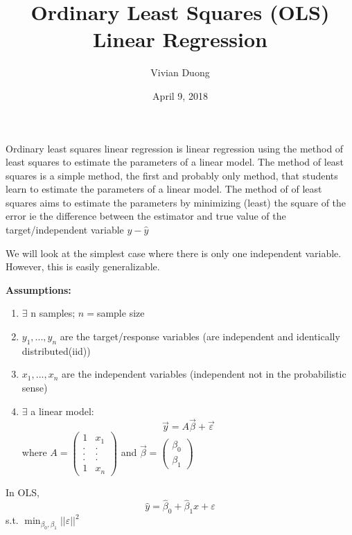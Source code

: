 \documentclass{article}
\title{Ordinary Least Squares (OLS) Linear Regression}
\author{Vivian Duong}
\date{April 9, 2018}
\begin{document}
\maketitle
Ordinary least squares linear regression is linear regression using the method of least squares to estimate the parameters of a linear model. The method of least squares is a simple method, the first and probably only method, that students learn to estimate the parameters of a linear model. \newline
The method of of least squares aims to estimate the parameters by minimizing (least) the square of the error ie the difference between the estimator and true value of the target/independent variable $ y - \hat{y}$

We will look at the simplest case where there is only one independent variable. However, this is easily generalizable.

\textbf{Assumptions:} \newline
\begin{enumerate}
	\item $\exists$ n samples; $n = $sample size
	\item $y_{1}, ..., y_{n}$ are the target/response variables (are independent and identically distributed(iid))
	\item $x_{1}, ..., x_{n}$ are the independent variables (independent not in the probabilistic sense) 
	\item $\exists$ a linear model:  
	\begin{equation} 
	\vec{y} = A\vec{\beta} + \vec{\varepsilon}
	\end{equation}
	\newline
	where $A = \left(\begin{array}{cc} 1 & x_1 \\ . & . \\ . & . \\ . & . \\ 1 & x_n \end{array} \right) $ and $\vec{\beta} = \left(\begin{array}{cc} \beta_0 \\ \beta_1 
	\end{array} \right)$
\end{enumerate}

In OLS,
\begin{equation}
\hat{y} = \hat{\beta}_0 + \hat{\beta}_1x + \varepsilon 
\end{equation}
s.t. $\displaystyle \min_{\beta_0, \beta_1} ||\varepsilon||^2$
\end{document}
